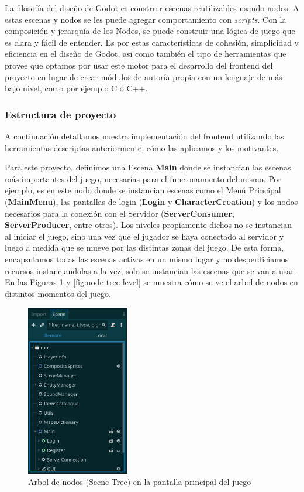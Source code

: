 La filosofía del diseño de Godot es construir escenas reutilizables usando nodos. A estas escenas y 
nodos se les puede agregar comportamiento con \textit{scripts}. Con la composición y jerarquía de los Nodos, 
se puede construir una lógica de juego que es clara y fácil de entender.
Es por estas características de cohesión, simplicidad y eficiencia en el diseño de Godot, así
como también el tipo de herramientas que provee que optamos por usar este motor para el desarrollo del
frontend del proyecto en lugar de crear módulos de autoría propia con un lenguaje de más bajo nivel, 
como por ejemplo C o C++.

\subsubsection{Estructura de proyecto}

\noindent A continuación detallamos nuestra implementación del frontend utilizando las herramientas descriptas
anteriormente, cómo las aplicamos y los motivantes.

Para este proyecto, definimos una Escena \textbf{Main} donde se instancian las escenas más importantes 
del juego, necesarias para el funcionamiento del mismo. Por ejemplo, es en este nodo donde se instancian
escenas como el Menú Principal (\textbf{MainMenu}), las pantallas de login (\textbf{Login} y \textbf{CharacterCreation}) y los nodos necesarios para la conexión 
con el Servidor (\textbf{ServerConsumer}, \textbf{ServerProducer}, entre otros).
Los niveles propiamente dichos no se instancian al iniciar el juego, sino una vez que el jugador 
se haya conectado al servidor y luego a medida que se mueve por las distintas zonas del juego.
De esta forma, encapsulamos todas las escenas activas en un mismo lugar y 
no desperdiciamos recursos instanciandolas a la vez, solo se instancian las escenas que
se van a usar. En las Figuras \ref{fig:node-tree-main-menu} y \ref{fig:node-tree-level} se muestra
cómo se ve el arbol de nodos en distintos momentos del juego.

\begin{figure}[htbp]
    \centering
    \includegraphics[width=0.4\textwidth]{../assets/godot-scene-tree-1.png}
    \caption{Arbol de nodos (Scene Tree) en la pantalla principal del juego}
    \label{fig:node-tree-main-menu}
\end{figure}

